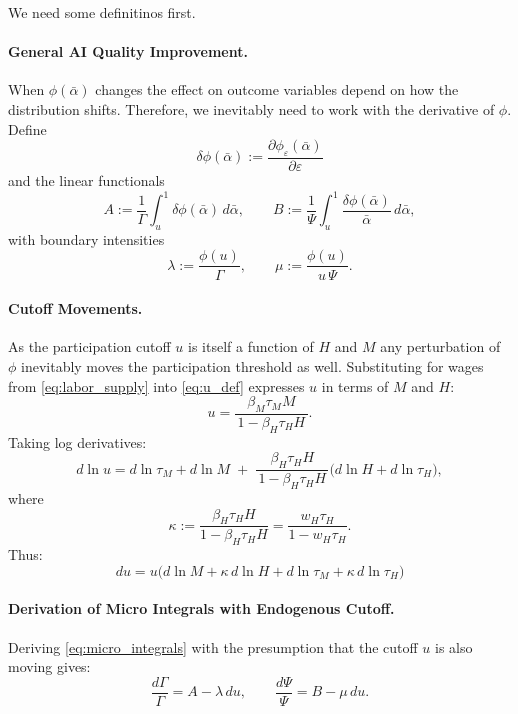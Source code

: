 \documentclass[english]{article}
\begin{document}
We need some definitinos first. 

\paragraph{General AI Quality Improvement.}
When $\phi(\bar{\alpha})$ changes the effect on outcome variables depend on how the distribution shifts.
Therefore, we inevitably need to work with the derivative of $\phi$. 
Define
\[
\delta\phi(\bar{\alpha}):= \frac{\partial \phi_\varepsilon(\bar{\alpha})}{\partial \varepsilon }
\]
and the linear functionals
\[
A:=\frac{1}{\Gamma}\int_u^{1}\delta\phi(\bar{\alpha})\,d\bar{\alpha},
\qquad
B:=\frac{1}{\Psi}\int_u^{1}\frac{\delta\phi(\bar{\alpha})}{\bar{\alpha}}\,d\bar{\alpha},
\]
with boundary intensities
\[
\lambda:=\frac{\phi(u)}{\Gamma},
\qquad 
\mu:=\frac{\phi(u)}{u\,\Psi}.
\]

\paragraph{Cutoff Movements.}
As the participation cutoff $u$ is itself a function of $H$ and $M$ any perturbation of $\phi$ inevitably moves the participation threshold as well.
Substituting for wages from \eqref{eq:labor_supply} into \eqref{eq:u_def} expresses $u$ in terms of $M$ and $H$:
\[
u=\dfrac{\beta_M\tau_M M}{\,1-\beta_H\tau_H H\,}.
\]
Taking log derivatives:
\[
d\ln u
= d\ln \tau_M + d\ln M \;+\; \frac{\beta_H\tau_H H}{\,1-\beta_H\tau_H H\,}\Big(d\ln H + d\ln \tau_H\Big),
\]
where
\begin{equation}
\kappa:=\frac{\beta_H\tau_H H}{1-\beta_H\tau_H H}=\frac{w_H\tau_H}{1-w_H\tau_H}. \label{eq:kappa}
\end{equation}
Thus:
\begin{equation}
\boxed{
du = u\Big(d\ln M + \kappa\,d\ln H + d\ln \tau_M + \kappa\,d\ln \tau_H\Big)}
\label{eq:du}
\end{equation}

\paragraph{Derivation of Micro Integrals with Endogenous Cutoff.}
Deriving \eqref{eq:micro_integrals} with the presumption that the cutoff $u$ is also moving gives:
\begin{equation}
\frac{d\Gamma}{\Gamma}=A-\lambda\,du,
\qquad
\frac{d\Psi}{\Psi}=B-\mu\,du.\label{eq:micro_int_variation}
\end{equation}
\end{document}
